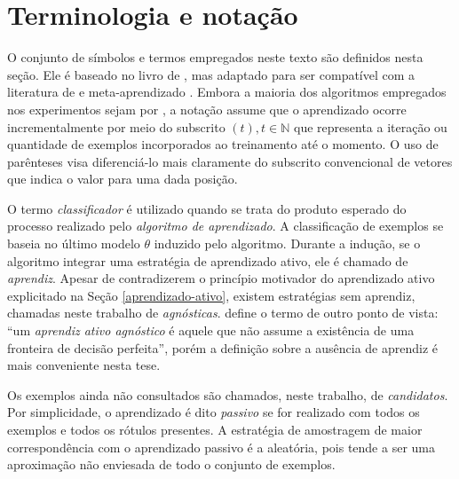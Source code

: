 \section{Terminologia e notação}\label{notacao}
O conjunto de símbolos e termos empregados neste texto são definidos nesta seção.
Ele é baseado no livro de \cite{series/synthesis/2012Settles}, mas adaptado para ser compatível
com a literatura de \elms e meta-aprendizado
\citep{journals/tsmc/HuangZDZ12,books/daglib/0022052}.
Embora a maioria dos algoritmos empregados nos experimentos sejam por
, a notação assume que o aprendizado ocorre incrementalmente
por meio do subscrito $(t), t \in \mathbb{N}$ que representa a iteração ou quantidade de exemplos
incorporados ao treinamento até o momento.
O uso de parênteses visa diferenciá-lo mais claramente do subscrito convencional de vetores que
indica o valor para uma dada posição.

O termo \textit{classificador} é utilizado quando se trata do produto esperado do processo
realizado pelo \textit{algoritmo de aprendizado}.
A classificação de exemplos se baseia no último modelo $\theta$ induzido pelo algoritmo.
Durante a indução, se o algoritmo integrar uma estratégia de aprendizado ativo,
ele é chamado de \textit{aprendiz}.
Apesar de contradizerem o princípio motivador do aprendizado ativo explicitado
na Seção \ref{aprendizado-ativo},
existem estratégias sem aprendiz, chamadas neste trabalho de \textit{agnósticas}.
\cite{conf/isaim/DasguptaHM08} define o termo de outro ponto de vista:
``um \textit{aprendiz ativo agnóstico} é aquele que não assume a existência de uma
fronteira de decisão perfeita'', porém a definição sobre a ausência de aprendiz
é mais conveniente nesta tese.

Os exemplos ainda não consultados são chamados, neste trabalho,
de \textit{candidatos}. 
Por simplicidade, o aprendizado é dito \textit{passivo} se for realizado com todos os exemplos e
todos os rótulos presentes.
A estratégia de amostragem de maior correspondência com o aprendizado passivo é a aleatória,
pois tende a ser uma aproximação não enviesada de todo o conjunto de exemplos.


